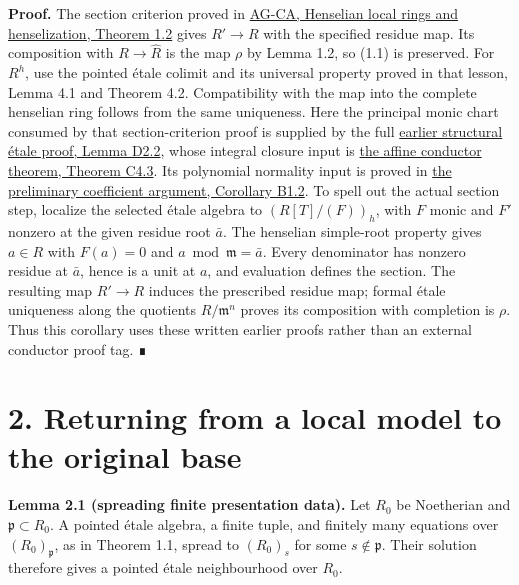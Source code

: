 \documentclass[11pt,a4paper,openany]{report}
\begin{document}
\textbf{Proof.} The section criterion proved in \href{https://github.com/KokunoYumeto/open-math-courses/blob/main/docs/courses/AG-CA/henselian-local-rings-and-henselization.html\#1-roots-and-maps-with-a-prescribed-residue}{AG-CA, Henselian local rings and henselization, Theorem 1.2} gives \(R'\to R\) with the specified residue map. Its composition with \(R\to\widehat R\) is the map \(\rho\) by Lemma 1.2, so (1.1) is preserved. For \(R^h\), use the pointed étale colimit and its universal property proved in that lesson, Lemma 4.1 and Theorem 4.2. Compatibility with the map into the complete henselian ring follows from the same uniqueness. Here the principal monic chart consumed by that section-criterion proof is supplied by the full \href{https://github.com/KokunoYumeto/open-math-courses/blob/main/docs/courses/AG-RG/AG-RG-S04.md}{earlier structural étale proof, Lemma D2.2}, whose integral closure input is \href{https://github.com/KokunoYumeto/open-math-courses/blob/main/docs/courses/AG-RG/AG-RG-S04.md}{the affine conductor theorem, Theorem C4.3}. Its polynomial normality input is proved in \href{https://github.com/KokunoYumeto/open-math-courses/blob/main/docs/courses/AG-RG/AG-RG-S04.md}{the preliminary coefficient argument, Corollary B1.2}. To spell out the actual section step, localize the selected étale algebra to \((R[T]/(F))_h\), with \(F\) monic and \(F'\) nonzero at the given residue root \(\bar a\). The henselian simple-root property gives \(a\in R\) with \(F(a)=0\) and \(a\bmod\mathfrak m=\bar a\). Every denominator has nonzero residue at \(\bar a\), hence is a unit at \(a\), and evaluation defines the section. The resulting map \(R'\to R\) induces the prescribed residue map; formal étale uniqueness along the quotients \(R/\mathfrak m^n\) proves its composition with completion is \(\rho\). Thus this corollary uses these written earlier proofs rather than an external conductor proof tag. ∎

\section{2. Returning from a local model to the original base}\label{AG-RG-S05-returning-from-a-local-model-to-the-original-base}

\textbf{Lemma 2.1 (spreading finite presentation data).} Let \(R_0\) be Noetherian and \(\mathfrak p\subset R_0\). A pointed étale algebra, a finite tuple, and finitely many equations over \((R_0)_{\mathfrak p}\), as in Theorem 1.1, spread to \((R_0)_s\) for some \(s\notin\mathfrak p\). Their solution therefore gives a pointed étale neighbourhood over \(R_0\).
\end{document}
